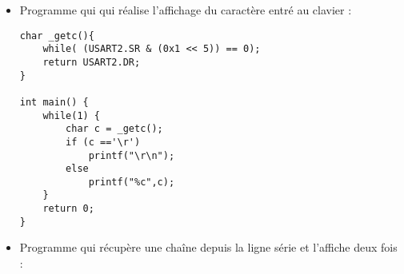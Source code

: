 \documentclass[10pt,a4,french]{article}
\begin{document}
\begin{itemize}
	\item Programme qui qui réalise l'affichage du caractère entré au clavier :
		\begin{lstlisting}
char _getc(){
	while( (USART2.SR & (0x1 << 5)) == 0);
	return USART2.DR;
}

int main() {
	while(1) {
		char c = _getc();
		if (c =='\r')
			printf("\r\n");
		else
			printf("%c",c);
	}
	return 0;
}
		\end{lstlisting}

	\item Programme qui récupère une chaîne depuis la ligne série et l'affiche deux fois :
		\begin{lstlisting}

		\end{lstlisting}

\end{itemize}
\end{document}
